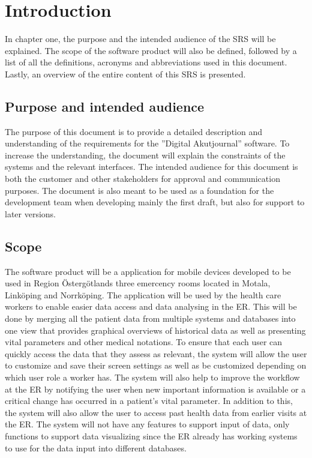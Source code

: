 \section{Introduction}
\label{sec:introduction}
In chapter one, the purpose and the intended audience of the SRS will be explained. The scope of the software product will also be defined, followed by a list of all the definitions, acronyms and abbreviations used in this document. Lastly, an overview of the entire content of this SRS is presented.  

\subsection{Purpose and intended audience}
The purpose of this document is to provide a detailed description and understanding of the requirements for the ''Digital Akutjournal'' software. To increase the understanding, the document will explain the constraints of the systems and the relevant interfaces. The intended audience for this document is both the customer and other stakeholders for approval and communication purposes. The document is also meant to be used as a foundation for the development team when developing mainly the first draft, but also for support to later versions.

\subsection{Scope}
The software product will be a application for mobile devices developed to be used in Region Östergötlands three emercency rooms located in Motala, Linköping and Norrköping. The application will be used by the health care workers to enable easier data access and data analysing in the ER. This will be done by merging all the patient data from multiple systems and databases into one view that provides graphical overviews of historical data as well as presenting vital parameters and other medical notations. To ensure that each user can quickly access the data that they assess as relevant, the system will allow the user to customize and save their screen settings as well as be customized depending on which user role a worker has. The system will also help to improve the workflow at the ER by notifying the user when new important information is available or a critical change has occurred in a patient's vital parameter. In addition to this, the system will also allow the user to access past health data from earlier visits at the ER. The system will not have any features to support input of data, only functions to support data visualizing since the ER already has working systems to use for the data input into different databases.

